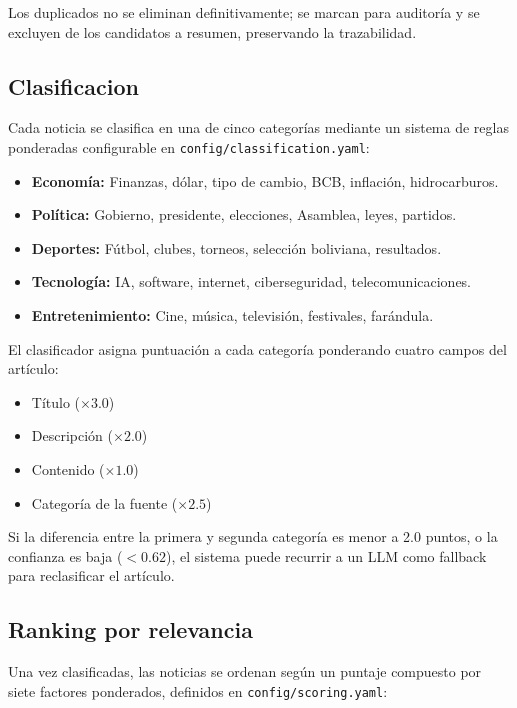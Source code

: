 \documentclass[12pt,oneside]{report}
\begin{document}
Los duplicados no se eliminan definitivamente; se marcan para auditor\'ia y se excluyen de los candidatos a resumen, preservando la trazabilidad.

\subsection{Clasificacion}

Cada noticia se clasifica en una de cinco categor\'ias mediante un sistema de reglas ponderadas configurable en \texttt{config/classification.yaml}:

\begin{itemize}[nosep]
    \item \textbf{Econom\'ia:} Finanzas, d\'olar, tipo de cambio, BCB, inflaci\'on, hidrocarburos.
    \item \textbf{Pol\'itica:} Gobierno, presidente, elecciones, Asamblea, leyes, partidos.
    \item \textbf{Deportes:} F\'utbol, clubes, torneos, selecci\'on boliviana, resultados.
    \item \textbf{Tecnolog\'ia:} IA, software, internet, ciberseguridad, telecomunicaciones.
    \item \textbf{Entretenimiento:} Cine, m\'usica, televisi\'on, festivales, far\'andula.
\end{itemize}

El clasificador asigna puntuaci\'on a cada categor\'ia ponderando cuatro campos del art\'iculo:
\begin{itemize}[nosep]
    \item T\'itulo ($\times 3.0$)
    \item Descripci\'on ($\times 2.0$)
    \item Contenido ($\times 1.0$)
    \item Categor\'ia de la fuente ($\times 2.5$)
\end{itemize}

Si la diferencia entre la primera y segunda categor\'ia es menor a 2.0 puntos, o la confianza es baja ($<0.62$), el sistema puede recurrir a un LLM como fallback para reclasificar el art\'iculo.

\subsection{Ranking por relevancia}

Una vez clasificadas, las noticias se ordenan seg\'un un puntaje compuesto por siete factores ponderados, definidos en \texttt{config/scoring.yaml}:
\end{document}
